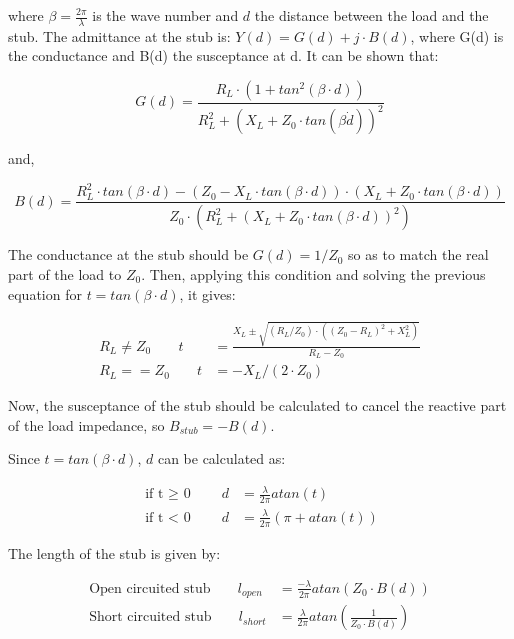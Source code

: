 \noindent where $\beta = \frac{2\pi}{\lambda}$ is the wave number and $d$ the distance between the load and the stub. The admittance at the stub is: $Y(d) = G(d)+j \cdot B(d)$, where G(d) is the conductance and B(d) the susceptance at d. It can be shown that:

\begin{equation}
G(d) = \frac{R_L \cdot (1 + tan^2(\beta \cdot d))}{R_L^2 + (X_L + Z_0\cdot tan(\beta \dot d))^2}
\end{equation}

\noindent and,

\begin{equation}
B(d) = \frac{R_L^2\cdot tan(\beta \cdot d) - (Z_0 - X_L\cdot tan(\beta \cdot d))\cdot (X_L + Z_0\cdot tan(\beta \cdot d))}{Z_0 \cdot (R_L^2 + (X_L + Z_0\cdot tan(\beta \cdot d))^2)}
\end{equation}

The conductance at the stub should be $G(d) = 1/Z_0$ so as to match the real part of the load to $Z_0$. Then, applying this condition and solving the previous equation for $t = tan(\beta \cdot d)$, it gives:

\begin{align}
R_L \neq Z_0 \;\;\;\;\;\;\;  t & = \frac{X_L \pm \sqrt{(R_L/Z_0) \cdot ((Z_0 - R_L)^2 + X_L^2)}}{R_L - Z_0} \\
R_L == Z_0 \;\;\;\;\;\;\;  t & = -X_L/(2\cdot Z_0)
\end{align}

\noindent Now, the susceptance of the stub should be calculated to cancel the reactive part of the load impedance, so $B_{stub} = -B(d)$.

\noindent Since $t=tan(\beta \cdot d)$, $d$ can be calculated as:

\begin{align}
\text{if t $\geq$ 0}\;\;\;\;\;\;\;  d & = \frac{\lambda}{2\pi} atan(t) \\
\text{if t $<$ 0}\;\;\;\;\;\;\;  d & = \frac{\lambda}{2\pi} (\pi + atan(t))
\end{align}

\noindent The length of the stub is given by:

\begin{align}
\text{Open circuited stub} \;\;\;\;\;\;\;  l_{open} & = \frac{-\lambda}{2\pi} atan\left(Z_0\cdot B(d)\right)  \\
\text{Short circuited stub}\;\;\;\;\;\;\;  l_{short} & = \frac{\lambda}{2\pi} atan\left(\frac{1}{Z_0\cdot B(d)}\right)
\end{align}

